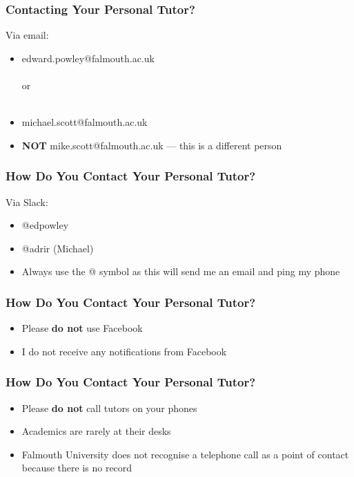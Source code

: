 \begin{frame}
	\frametitle{Contacting Your Personal Tutor?}	
	
	Via email:
	
	\begin{itemize}
		\item edward.powley@falmouth.ac.uk
		\\~\\
		or
		\\~\\
		\item michael.scott@falmouth.ac.uk
		\item \textbf{NOT} mike.scott@falmouth.ac.uk --- this is a different person
	\end{itemize}
\end{frame}

\begin{frame}
	\frametitle{How Do You Contact Your Personal Tutor?}
	
	Via Slack:	
				
	\begin{itemize}
		\item @edpowley \pause
		\item @adrir (Michael) \pause
		\item Always use the @ symbol as this will send me an email and ping my phone
	\end{itemize}
\end{frame}

\begin{frame}
	\frametitle{How Do You Contact Your Personal Tutor?}	
	\begin{itemize}
		\item Please \textbf{do not} use Facebook
		\item I do not receive any notifications from Facebook
	\end{itemize}
\end{frame}

\begin{frame}
	\frametitle{How Do You Contact Your Personal Tutor?}	
	\begin{itemize}
		\item Please \textbf{do not} call tutors on your phones
		\item Academics are rarely at their desks
		\item Falmouth University does not recognise a telephone call as a point of contact because there is no record
	\end{itemize}
\end{frame}

